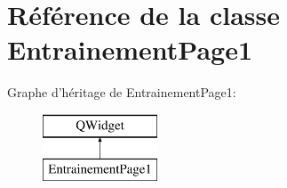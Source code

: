 \section{Référence de la classe Entrainement\-Page1}
\label{class_entrainement_page1}
Graphe d'héritage de Entrainement\-Page1\-:\begin{figure}[H]
\begin{center}
\leavevmode
\includegraphics[height=2.000000cm]{class_entrainement_page1}
\end{center}
\end{figure}
